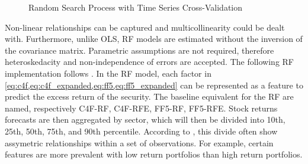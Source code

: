 \begin{figure}[H]
    \caption{Random Search Process with Time Series Cross-Validation}
    \end{figure}

    

Non-linear relationships can be captured and multicollinearity could be dealt with. Furthermore, unlike OLS, RF models are estimated without the inversion of the covariance matrix. Parametric assumptions are not required, therefore heteroskedacity and non-independence of errors are accepted. The following RF implementation follows . In the RF model, each factor in \cref{eq:c4f,eq:c4f_expanded,eq:ff5,eq:ff5_expanded} can be represented as a feature to predict the excess return of the security. The baseline equivalent for the RF are named, respectively C4F-RF, C4F-RFE, FF5-RF, FF5-RFE. Stock returns forecasts are then aggregated by sector, which will then be divided into 10th, 25th, 50th, 75th, and 90th percentile. According to , this divide often show assymetric relationships within a set of observations. For example, certain features are more prevalent with low return portfolios than high return portfolios.


